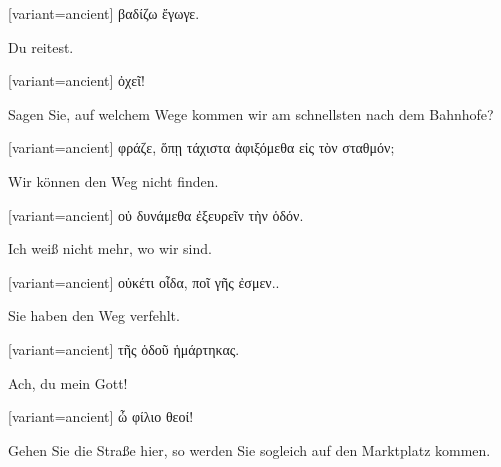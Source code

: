 \switchcolumn

\begin{greek}[variant=ancient]%
βαδίζω ἔγωγε.

\end{greek}%
\switchcolumn*

Du reitest.

\switchcolumn

\begin{greek}[variant=ancient]%
ὀχεῖ!

\end{greek}%
\switchcolumn*

Sagen Sie, auf welchem Wege kommen wir am schnellsten nach dem Bahnhofe?

\switchcolumn

\begin{greek}[variant=ancient]%
φράζε, ὅπῃ τάχιστα ἀφιξόμεθα εἰς τὸν σταθμόν;

\end{greek}%
\switchcolumn*

Wir können den Weg nicht finden.

\switchcolumn

\begin{greek}[variant=ancient]%
οὐ δυνάμεθα ἐξευρεῖν τὴν ὁδόν.

\end{greek}%
\switchcolumn*

Ich weiß nicht mehr, wo wir sind.

\switchcolumn

\begin{greek}[variant=ancient]%
οὐκέτι οἶδα, ποῖ γῆς ἐσμεν..

\end{greek}%
\switchcolumn*

Sie haben den Weg verfehlt.

\switchcolumn

\begin{greek}[variant=ancient]%
τῆς ὁδοῦ ἡμάρτηκας.

\end{greek}%
\switchcolumn*

Ach, du mein Gott!

\switchcolumn

\begin{greek}[variant=ancient]%
ὦ φίλιο θεοί!

\end{greek}%
\switchcolumn*

Gehen Sie die Straße hier, so werden Sie sogleich auf den Marktplatz
kommen.

